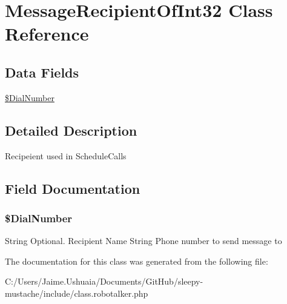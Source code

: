 \hypertarget{class_message_recipient_of_int32}{\section{Message\-Recipient\-Of\-Int32 Class Reference}
\label{class_message_recipient_of_int32}
}
\subsection*{Data Fields}
\begin{DoxyCompactItemize}
\item 
\hyperlink{class_message_recipient_of_int32_a80e5e7a3e0698eb7784c0251e40b8077}{\$\-Dial\-Number}
\end{DoxyCompactItemize}


\subsection{Detailed Description}
Recipeient used in Schedule\-Calls 

\subsection{Field Documentation}
\hypertarget{class_message_recipient_of_int32_a80e5e7a3e0698eb7784c0251e40b8077}{
\subsubsection[{\$\-Dial\-Number}]{\setlength{\rightskip}{0pt plus 5cm}\$Dial\-Number}}\label{class_message_recipient_of_int32_a80e5e7a3e0698eb7784c0251e40b8077}
String Optional. Recipient Name String Phone number to send message to 

The documentation for this class was generated from the following file\-:\begin{DoxyCompactItemize}
\item 
C\-:/\-Users/\-Jaime.\-Ushuaia/\-Documents/\-Git\-Hub/sleepy-\/mustache/include/class.\-robotalker.\-php\end{DoxyCompactItemize}
